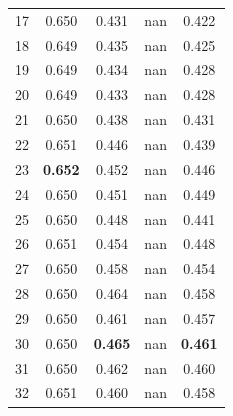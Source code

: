 \documentclass[11pt,a4paper]{article}
\begin{document}
\begin{table}[H]
\begin{tabular}{rcccc}
17 & 0.650 & 0.431 & nan & 0.422 \\

18 & 0.649 & 0.435 & nan & 0.425 \\

19 & 0.649 & 0.434 & nan & 0.428 \\

20 & 0.649 & 0.433 & nan & 0.428 \\

21 & 0.650 & 0.438 & nan & 0.431 \\

22 & 0.651 & 0.446 & nan & 0.439 \\

23 & \textbf{0.652} & 0.452 & nan & 0.446 \\

24 & 0.650 & 0.451 & nan & 0.449 \\

25 & 0.650 & 0.448 & nan & 0.441 \\

26 & 0.651 & 0.454 & nan & 0.448 \\

27 & 0.650 & 0.458 & nan & 0.454 \\

28 & 0.650 & 0.464 & nan & 0.458 \\

29 & 0.650 & 0.461 & nan & 0.457 \\

30 & 0.650 & \textbf{0.465} & nan & \textbf{0.461} \\

31 & 0.650 & 0.462 & nan & 0.460 \\

32 & 0.651 & 0.460 & nan & 0.458 \\

\bottomrule

\end{tabular}

\end{table}
\end{document}
